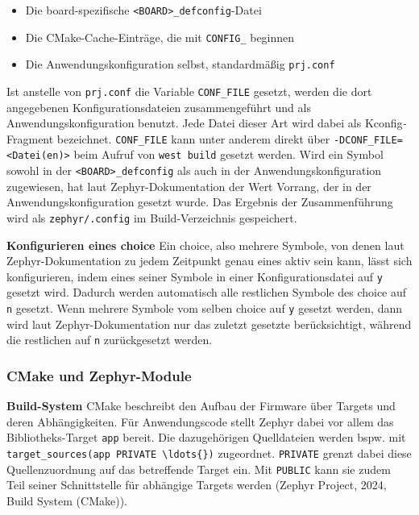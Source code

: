 \begin{itemize}
\item Die board-spezifische \lstinline[style=codeinline]|<BOARD>_defconfig|-Datei
\item Die CMake-Cache-Eintr{\"a}ge, die mit \lstinline[style=codeinline]|CONFIG_| beginnen
\item Die Anwendungskonfiguration selbst, standardm{\"a}{\ss}ig \lstinline[style=codeinline]|prj.conf|
\end{itemize}
Ist anstelle von \lstinline[style=codeinline]|prj.conf| die Variable \lstinline[style=codeinline]|CONF_FILE| gesetzt, werden die dort angegebenen Konfigurationsdateien zusammengef{\"u}hrt und als Anwendungskonfiguration benutzt. Jede Datei dieser Art wird dabei als \glqq{}Kconfig\emph{-}Fragment\grqq{} bezeichnet. \lstinline[style=codeinline]|CONF_FILE| kann unter anderem direkt {\"u}ber \lstinline[style=codeinline]|-DCONF_FILE=<Datei(en)>| beim Aufruf von \lstinline[style=codeinline]|west build| gesetzt werden. Wird ein Symbol sowohl in der \lstinline[style=codeinline]|<BOARD>_defconfig| als auch in der Anwendungskonfiguration zugewiesen, hat laut Zephyr-Dokumentation der  Wert Vorrang, der in der Anwendungskonfiguration gesetzt wurde. Das Ergebnis der Zusammenf{\"u}hrung wird als \lstinline[style=codeinline]|zephyr/.config| im Build-Verzeichnis gespeichert.

\textbf{Konfigurieren eines choice} Ein choice, also mehrere Symbole, von denen laut Zephyr-Dokumentation zu jedem Zeitpunkt genau eines aktiv sein kann, l{\"a}sst sich konfigurieren, indem eines seiner Symbole in einer Konfigurationsdatei auf \lstinline[style=codeinline]|y| gesetzt wird. Dadurch werden automatisch alle restlichen Symbole des choice auf \lstinline[style=codeinline]|n| gesetzt. Wenn mehrere Symbole vom selben choice auf \lstinline[style=codeinline]|y| gesetzt werden, dann wird laut Zephyr-Dokumentation nur das zuletzt gesetzte ber{\"u}cksichtigt, w{\"a}hrend die restlichen auf \lstinline[style=codeinline]|n| zur{\"u}ckgesetzt werden.

\subsubsection{CMake und Zephyr-Module}
\textbf{Build-System} CMake beschreibt den Aufbau der Firmware {\"u}ber Targets und deren Abh{\"a}ngigkeiten. F{\"u}r Anwendungscode stellt Zephyr dabei vor allem das Bibliotheks-Target \lstinline[style=codeinline]|app| bereit. Die dazugeh{\"o}rigen Quelldateien werden bspw. mit \lstinline[style=codeinline]|target_sources(app PRIVATE \ldots{})| zugeordnet. \lstinline[style=codeinline]|PRIVATE| grenzt dabei diese Quellenzuordnung auf das betreffende Target ein. Mit \lstinline[style=codeinline]|PUBLIC| kann sie zudem Teil seiner Schnittstelle f{\"u}r abh{\"a}ngige Targets werden (Zephyr Project, 2024, \glqq{}Build System (CMake)\grqq{}).


